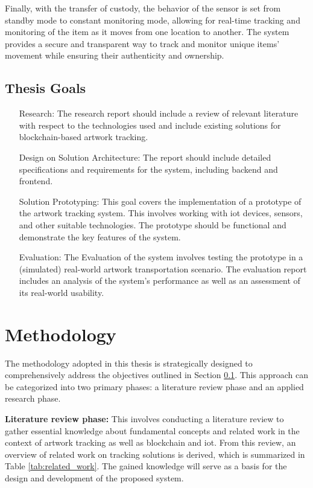 Finally, with the transfer of custody, the behavior of the sensor is set from standby mode to constant monitoring mode, allowing for real-time tracking and monitoring of the item as it moves from one location to another. The system provides a secure and transparent way to track and monitor unique items' movement while ensuring their authenticity and ownership.

\subsection{Thesis Goals}
\label{sec:thesis_goals}
\begin{itemize}[font=\textbf, align=left]
    \item[Research:] The research report should include a review of relevant literature with respect to the technologies used and include existing solutions for blockchain-based artwork tracking.
    \item[Design on Solution Architecture:] The report should include detailed specifications and requirements for the system, including backend and frontend.
    \item[Solution Prototyping:] This goal covers the implementation of a prototype of the artwork tracking system. This involves working with \gls{iot} devices, sensors, and other suitable technologies. The prototype should be functional and demonstrate the key features of the system.
    \item[Evaluation:] The Evaluation of the system involves testing the prototype in a (simulated) real-world artwork transportation scenario. The evaluation report includes an analysis of the system's performance as well as an assessment of its real-world usability.
\end{itemize}

\section{Methodology} %
The methodology adopted in this thesis is strategically designed to comprehensively address the objectives outlined in Section \ref{sec:thesis_goals}. This approach can be categorized into two primary phases: a literature review phase and an applied research phase.

\textbf{Literature review phase:} This involves conducting a literature review to gather essential knowledge about fundamental concepts and related work in the context of artwork tracking as well as blockchain and \gls{iot}. From this review, an overview of related work on tracking solutions is derived, which is summarized in Table \ref{tab:related_work}. The gained knowledge will serve as a basis for the design and development of the proposed system.

